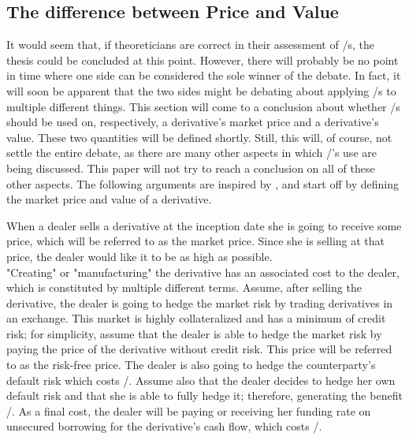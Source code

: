\documentclass[main.tex]{subfiles}
\begin{document}
    \subsection{The difference between Price and Value}
    \label{sec:price-versus-value}

    It would seem that, if theoreticians are correct in their assessment of \FVA/s,
    the thesis could be concluded at this point.
    However, there will probably be no point in time where one side
    can be considered the sole winner of the debate.
    In fact, it will soon be apparent that the two sides might be debating
    about applying \FVA/s to multiple different things.
    This section will come to a conclusion about whether \FVA/s should be used
    on, respectively, a derivative's market price and a derivative's value.
    These two quantities will be defined shortly. 
    Still, this will, of course, not settle the entire debate,
    as there are many other aspects in which \FVA/'s use are being discussed.
    This paper will not try to reach a conclusion on all of these other aspects.
    The following arguments are inspired by \textcite{Ruiz2015XVA},
    and start off by defining the market price and value of a derivative.

    When a dealer sells a derivative at the inception date she is going to receive some price,
    which will be referred to as the market price.
    Since she is selling at that price, the dealer would like it to be as high as possible.
    \\
    "Creating" or "manufacturing" the derivative has an associated cost to the dealer,
    which is constituted by multiple different terms.
    Assume, after selling the derivative, the dealer is going to hedge the market risk
    by trading derivatives in an exchange.
    This market is highly collateralized and has a minimum of credit risk;
    for simplicity, assume that the dealer is able to hedge the market risk by paying
    the price of the derivative without credit risk. 
    This price will be referred to as the risk-free price.
    The dealer is also going to hedge the counterparty's default risk which costs \CVA/.
    Assume also that the dealer decides to hedge her own default risk
    and that she is able to fully hedge it; therefore, generating the benefit \DVA/.
    As a final cost, the dealer will be paying or receiving her funding rate on unsecured borrowing
    for the derivative's cash flow, which costs \FVA/.
    
\end{document}

